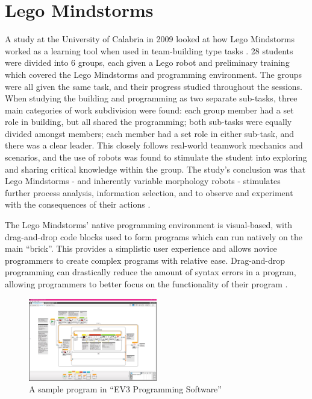 \documentclass{report}
\begin{document}
    \section{Lego Mindstorms}
    A study at the University of Calabria in 2009 looked at how Lego Mindstorms worked as a learning tool when used in team-building type tasks \cite{Bilotta2009}. 28 students were divided into 6 groups, each given a Lego robot and preliminary training which covered the Lego Mindstorms and programming environment. The groups were all given the same task, and their progress studied throughout the sessions. When studying the building and programming as two separate sub-tasks, three main categories of work subdivision were found: each group member had a set role in building, but all shared the programming; both sub-tasks were equally divided amongst members; each member had a set role in either sub-task, and there was a clear leader. This closely follows real-world teamwork mechanics and scenarios, and the use of robots was found to stimulate the student into exploring and sharing critical knowledge within the group. The study's conclusion was that Lego Mindstorms - and inherently variable morphology robots - stimulates further process analysis, information selection, and to observe and experiment with the consequences of their actions \cite{Bilotta2009}.
    
    The Lego Mindstorms’ native programming environment is visual-based, with drag-and-drop code blocks used to form programs which can run natively on the main \enquote{brick}. This provides a simplistic user experience and allows novice programmers to create complex programs with relative ease. Drag-and-drop programming can drastically reduce the amount of syntax errors in a program, allowing programmers to better focus on the functionality of their program \cite{Kelleher2002}.

	\begin{figure}[h]
		\begin{center}
			\includegraphics[width=0.5\textwidth]{Images/EV3ProgrammingSoftware.jpg}
			\caption{A sample program in \enquote{EV3 Programming Software}}
			\label{fig:ev3software}
		\end{center}
	\end{figure}
    
\end{document}
